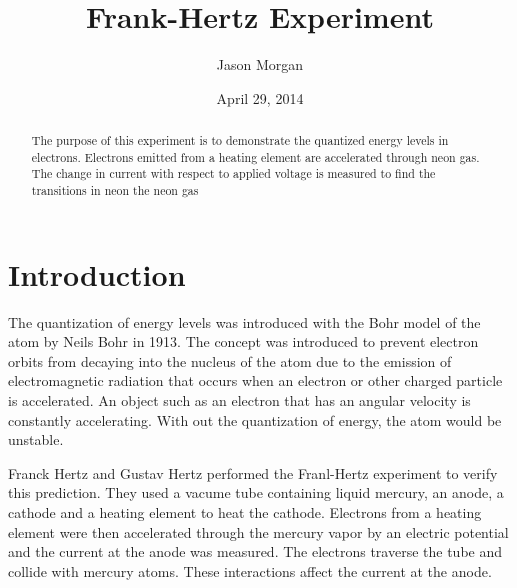 \documentclass[twocolumn,secnumarabic,amssymb, nobibnotes, aps, pra]{revtex4}
\begin{document}
\title{Frank-Hertz Experiment
 }


\author{Jason Morgan}



\date{April 29, 2014}


\begin{abstract}
The purpose of this experiment is to demonstrate the quantized energy levels in electrons. Electrons emitted from a heating element are accelerated through neon gas.  The change in current with respect to applied voltage is measured to find the transitions in neon the neon gas
\end{abstract}

\maketitle
\section{Introduction}

The quantization of energy levels was introduced with the Bohr model of the atom by Neils Bohr in 1913.  The concept was introduced to prevent electron orbits from decaying into the nucleus of the atom due to the emission of electromagnetic radiation that occurs when an electron or other charged particle is accelerated.  An object such as an electron that has an angular velocity is constantly accelerating.  With out the quantization of energy, the atom would be unstable.

Franck Hertz and Gustav Hertz performed the Franl-Hertz experiment to verify this prediction.  They used a vacume tube containing liquid mercury, an anode, a cathode and a heating element to heat the cathode.  Electrons from a heating element were then accelerated through the mercury vapor by an electric potential and the current at the anode was measured.  The electrons traverse the tube and collide with mercury atoms.  These interactions affect the current at the anode.  
\end{document}
